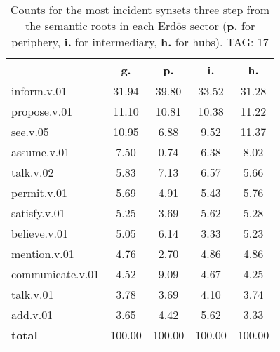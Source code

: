 \begin{table}[h!]
\begin{center}
\begin{tabular}{| l || c | c | c | c |}\hline
 & {\bf g.} & {\bf p.} & {\bf i.} & {\bf h.} \\\hline\hline
inform.v.01 & 31.94  & 39.80  & 33.52  & 31.28 \\\hline
propose.v.01 & 11.10  & 10.81  & 10.38  & 11.22 \\\hline
see.v.05 & 10.95  & 6.88  & 9.52  & 11.37 \\\hline
assume.v.01 & 7.50  & 0.74  & 6.38  & 8.02 \\\hline
talk.v.02 & 5.83  & 7.13  & 6.57  & 5.66 \\\hline
permit.v.01 & 5.69  & 4.91  & 5.43  & 5.76 \\\hline
satisfy.v.01 & 5.25  & 3.69  & 5.62  & 5.28 \\\hline
believe.v.01 & 5.05  & 6.14  & 3.33  & 5.23 \\\hline
mention.v.01 & 4.76  & 2.70  & 4.86  & 4.86 \\\hline
communicate.v.01 & 4.52  & 9.09  & 4.67  & 4.25 \\\hline
talk.v.01 & 3.78  & 3.69  & 4.10  & 3.74 \\\hline
add.v.01 & 3.65  & 4.42  & 5.62  & 3.33 \\\hline\hline
{{\bf total}} & 100.00  & 100.00  & 100.00  & 100.00 \\\hline
\end{tabular}
\caption{Counts for the most incident synsets three step from the semantic roots in each Erd\"os sector ({\bf p.} for periphery, {\bf i.} for intermediary, {\bf h.} for hubs). TAG: 17}
\end{center}
\end{table}
